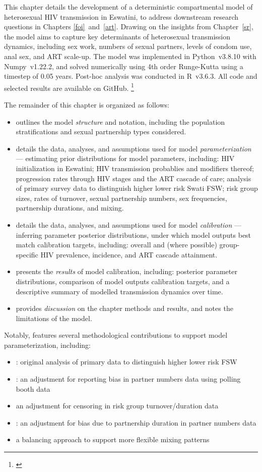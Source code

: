 This chapter details the development of
a deterministic compartmental model of heterosexual HIV transmission in Eswatini,
to address downstream research questions in Chapters \ref{foi}~and~\ref{art}.
Drawing on the insights from Chapter~\ref{sr},
the model aims to capture key determinants of heterosexual transmission dynamics, including
sex work, numbers of sexual partners, levels of condom use, anal sex, and ART scale-up.
The model was implemented in Python~v3.8.10 with Numpy~v1.22.2,
and solved numerically using 4th order Runge-Kutta \cite{Gill1951} using a timestep of 0.05 years.
Post-hoc analysis was conducted in R~v3.6.3.
All code and selected results are available on GitHub.%
\footnote{\label{foot:github}}
\par
The remainder of this chapter is organized as follows:
\newcommand{\iref}[1]{\item \sref{#1}}
\begin{itemize}
  \iref{model.str} outlines the model \emph{structure} and notation, including
  the population stratifications and sexual partnership types considered.
  \iref{model.par} details the data, analyses, and assumptions used for model \emph{parameterization}
  --- \ie estimating prior distributions for model parameters, including:
  HIV initialization in Eswatini;
  HIV transmission probablies and modifiers thereof;
  progression rates through HIV stages and the ART cascade of care;
  analysis of primary survey data to distinguish higher \vs lower risk Swati FSW;
  risk group sizes, rates of turnover, sexual partnership numbers,
  sex frequencies, partnership durations, and mixing.
  \iref{model.cal} details the data, analyses, and assumptions used for model \emph{calibration}
  --- \ie inferring parameter posterior distributions,
  under which model outputs best match calibration targets, including:
  overall and (where possible) group-specific HIV prevalence, incidence, and ART cascade attainment.
  \iref{model.res} presents the \emph{results} of model calibration, including:
  posterior parameter distributions, comparison of model outputs \vs calibration targets, and
  a descriptive summary of modelled transmission dynamics over time.
  \iref{model.disc} provides \emph{discussion} on the chapter methods and results,
  and notes the limitations of the model.
\end{itemize}
\pagebreak %
Notably,  features several methodological contributions
to support model parameterization, including:
\begin{itemize}
  \item{}:
  original analysis of primary data to distinguish higher \vs lower risk FSW
  \item{}:
  an adjustment for reporting bias in partner numbers data using polling booth data
  \item{}
  an adjustment for censoring in risk group turnover/duration data
  \item{}:
  an adjustment for bias due to partnership duration in partner numbers data
  \item{}
  a balancing approach to support more flexible mixing patterns
\end{itemize}
